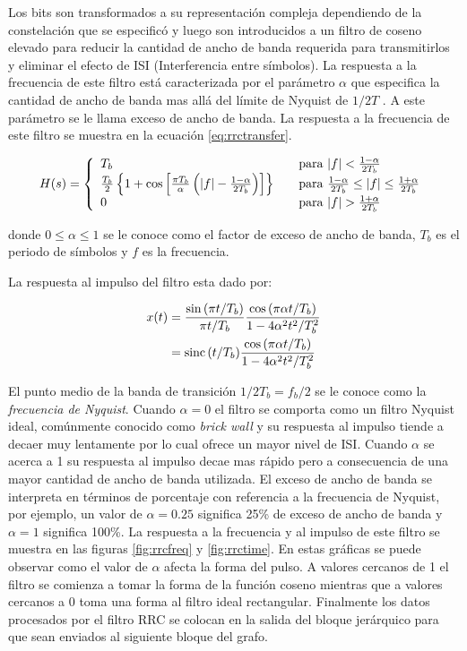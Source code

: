 Los bits son transformados a su representaci\'on compleja dependiendo de la constelaci\'on que se
especific\'o y luego son introducidos a un filtro de coseno elevado para
reducir la cantidad de ancho de banda requerida para transmitirlos y eliminar el efecto de ISI
(Interferencia entre s\'imbolos). La respuesta a la frecuencia de este filtro est\'a caracterizada
por el par\'ametro $\alpha$ que especifica la cantidad de ancho de banda mas all\'a del l\'imite de
Nyquist de $1/2T$ \cite{sklar}. A este par\'ametro se le llama exceso de ancho de banda. La
respuesta a la frecuencia de este filtro se muestra en la ecuaci\'on \eqref{eq:rrctransfer}.

\begin{equation}\label{eq:rrctransfer}
H(s)=\left\{
\begin{array}{l l}
T_b & \quad \text{para $|f| < \frac{1-\alpha}{2T_b}$}\\
\frac{T_b}{2}\left\{1+\cos{\left[\frac{\pi
T_b}{\alpha}\left(|f|-\frac{1-\alpha}{2T_b}\right)\right]}\right\} & \quad \text{para
$\frac{1-\alpha}{2T_b} \leq |f| \leq \frac{1+\alpha}{2T_b}$}\\ 0 & \quad \text{para $|f| >
\frac{1+\alpha}{2T_b}$} \end{array}\right.
\end{equation}

donde $0 \leq \alpha \leq 1$ se le conoce como el factor de exceso de ancho de banda, $T_b$ es el
periodo de s\'imbolos y $f$ es la frecuencia. 

La respuesta al impulso del filtro esta dado por:

\begin{align}\label{eq:imptransfer}
x(t)&=\frac{\sin{(\pi t/T_b)}}{\pi t/T_b}\frac{\cos{(\pi\alpha t/T_b)}}{1-4\alpha^2t^2/T_b^2}
\nonumber \\ 
&=\operatorname{sinc}{(t/T_b)}\frac{\cos{(\pi \alpha t/T_b)}}{1-4\alpha^2t^2/T_b^2}
\end{align}

El punto medio de la banda de transici\'on $1/2T_b=f_b/2$ se le conoce como la \emph{frecuencia de
Nyquist}. Cuando $\alpha=0$ el filtro se comporta como un filtro Nyquist ideal, com\'unmente
conocido como \emph{brick wall} y su respuesta al impulso tiende a decaer muy lentamente por lo
cual ofrece un mayor nivel de ISI. Cuando $\alpha$ se acerca a 1 su respuesta al impulso decae mas
r\'apido pero a consecuencia de una mayor cantidad de ancho de banda utilizada. El exceso de ancho
de banda se interpreta en t\'erminos de porcentaje con referencia a la frecuencia de Nyquist, por
ejemplo, un valor de $\alpha=0.25$ significa 25\% de exceso de ancho de banda y $\alpha=1$
significa 100\%. La respuesta a la frecuencia y al impulso de este filtro se muestra en las figuras
\ref{fig:rrcfreq} y \ref{fig:rrctime}. En estas gr\'aficas se puede observar como el valor de $\alpha$ afecta la forma del
pulso. A valores cercanos de 1 el filtro se comienza a tomar la forma de la funci\'on coseno mientras que a valores
cercanos a 0 toma una forma al filtro ideal rectangular. Finalmente los datos procesados por el filtro RRC se colocan en la
salida del bloque jer\'arquico para que sean enviados al siguiente bloque del grafo.


